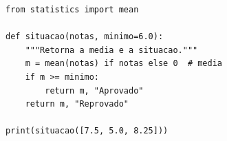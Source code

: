 \documentclass[12pt, a4paper, brazilian]{abntex2}
\begin{document}
\begin{verbatim}
from statistics import mean

def situacao(notas, minimo=6.0):
    """Retorna a media e a situacao."""
    m = mean(notas) if notas else 0  # media
    if m >= minimo:
        return m, "Aprovado"
    return m, "Reprovado"

print(situacao([7.5, 5.0, 8.25]))
\end{verbatim}
\end{document}
